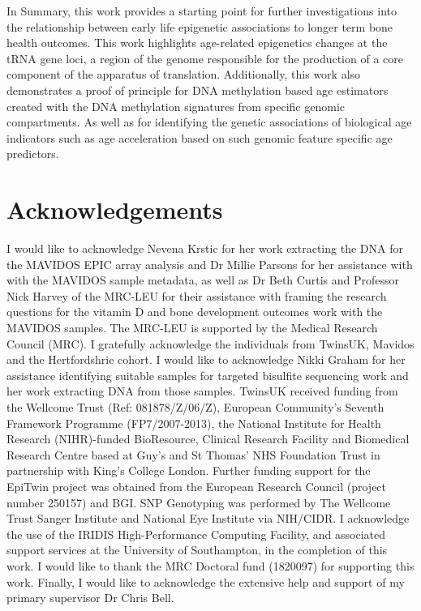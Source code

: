 \documentclass[
]{book}
\begin{document}
In Summary, this work provides a starting point for further investigations into the relationship between early life epigenetic associations to longer term bone health outcomes.
This work highlights age-related epigenetics changes at the tRNA gene loci, a region of the genome responsible for the production of a core component of the apparatus of translation.
Additionally, this work also demonstrates a proof of principle for DNA methylation based age estimators created with the DNA methylation signatures from specific genomic compartments.
As well as for identifying the genetic associations of biological age indicators such as age acceleration based on such genomic feature specific age predictors.

\hypertarget{acknowledgements}{%
\chapter*{Acknowledgements}\label{acknowledgements}}

I would like to acknowledge Nevena Krstic for her work extracting the DNA for the MAVIDOS EPIC array analysis and Dr Millie Parsons for her assistance with with the MAVIDOS sample metadata, as well as Dr Beth Curtis and Professor Nick Harvey of the MRC-LEU for their assistance with framing the research questions for the vitamin D and bone development outcomes work with the MAVIDOS samples.
The MRC-LEU is supported by the Medical Research Council (MRC).
I gratefully acknowledge the individuals from TwinsUK, Mavidos and the Hertfordshrie cohort.
I would like to acknowledge Nikki Graham for her assistance identifying suitable samples for targeted bisulfite sequencing work and her work extracting DNA from those samples.
TwinsUK received funding from the Wellcome Trust (Ref: 081878/Z/06/Z), European Community's Seventh Framework Programme (FP7/2007-2013), the National Institute for Health Research (NIHR)-funded BioResource, Clinical Research Facility and Biomedical Research Centre based at Guy's and St Thomas' NHS Foundation Trust in partnership with King's College London.
Further funding support for the EpiTwin project was obtained from the European Research Council (project number 250157) and BGI.
SNP Genotyping was performed by The Wellcome Trust Sanger Institute and National Eye Institute via NIH/CIDR.
I acknowledge the use of the IRIDIS High-Performance Computing Facility, and associated support services at the University of Southampton, in the completion of this work.
I would like to thank the MRC Doctoral fund (1820097) for supporting this work.
Finally, I would like to acknowledge the extensive help and support of my primary supervisor Dr Chris Bell.
\end{document}
